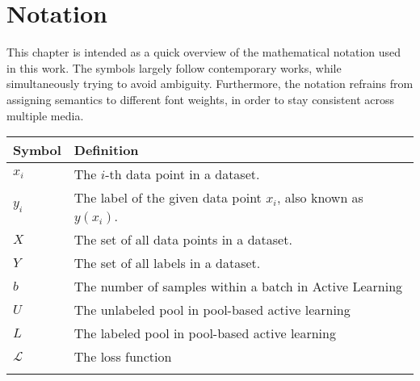 \chapter*{Notation}
\label{ch:notation}

This chapter is intended as a quick overview of the mathematical notation used in this work.
The symbols largely follow contemporary works, while simultaneously trying to avoid ambiguity.
Furthermore, the notation refrains from assigning semantics to different font weights, in order to stay consistent across multiple media.

\begin{tabularx}{\textwidth}{l X}
    \toprule
    Symbol & Definition \\
    \midrule
    $x_i$ & The $i$-th data point in a dataset. \\ \addlinespace
    $y_i$ & The label of the given data point $x_i$, also known as $y(x_i)$. \\ \addlinespace
    $X$ & The set of all data points in a dataset. \\ \addlinespace
    $Y$ & The set of all labels in a dataset. \\ \addlinespace
    $b$ & The number of samples within a batch in Active Learning \\ \addlinespace
    $U$ & The unlabeled pool in pool-based active learning\\ \addlinespace
    $L$ & The labeled pool in pool-based active learning\\ \addlinespace
    $\mathcal{L}$ & The loss function \\ \addlinespace
    \bottomrule
\end{tabularx}
\label{tab:notation}